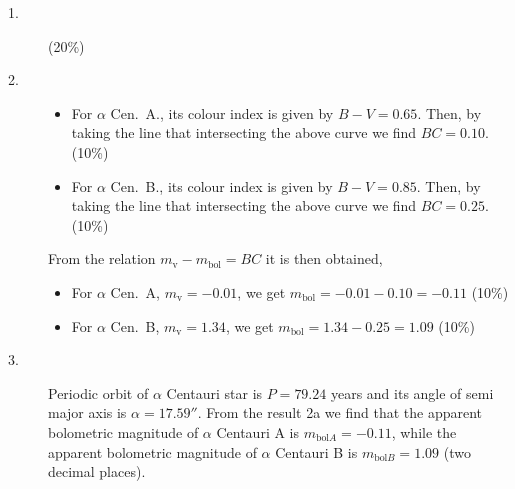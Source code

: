 \begin{description}
\item[1.] %
  \hfill(20\%)

\item[2.] %

  \begin{itemize}
  \item For $\alpha$ Cen.\ A., its colour index is given by $B-V = 0.65$.
    Then, by taking the line that intersecting the above curve we find
    $BC = 0.10$. \hfill(10\%)
  \item For $\alpha$ Cen.\ B., its colour index is given by $B-V = 0.85$.
    Then, by taking the line that intersecting the above curve we find
    $BC = 0.25$. \hfill(10\%)
  \end{itemize}
  From the relation $m_{\mathrm{v}} - m_{\mathrm{bol}} = BC$ it is then
  obtained,
  \begin{itemize}
  \item For $\alpha$ Cen.\ A, $m_{\mathrm{v}} = -0.01$, we get
    $m_{\mathrm{bol}} = -0.01 - 0.10 = -0.11$ \hfill(10\%)
  \item For $\alpha$ Cen.\ B, $m_{\mathrm{v}} = 1.34$, we get
    $m_{\mathrm{bol}} = 1.34 - 0.25 = 1.09$ \hfill(10\%)
  \end{itemize}

\item[3.] Periodic orbit of $\alpha$ Centauri star is $P = 79.24$ years and
  its angle of semi major axis is $\alpha = 17.59''$. From the result 2a we
  find that the apparent bolometric magnitude of $\alpha$ Centauri A is
  $m_{\mathrm{bol}A} = -0.11$, while the apparent bolometric magnitude of
  $\alpha$ Centauri B is $m_{\mathrm{bol}B} = 1.09$ (two decimal places).


\end{description}
